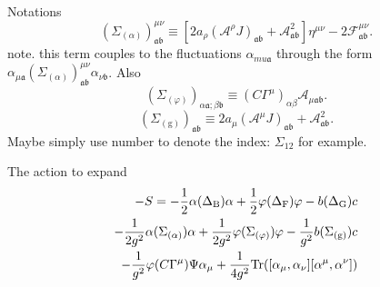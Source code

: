 
Notations
\[
	(\Sigma_{(\alpha)})^{\mu\nu}_{\mathfrak{a}\mathfrak{b}}
	\equiv \left[
	2 a_\rho (\mathcal{A}^\rho J)_{\mathfrak{a}\mathfrak{b}}
	+ \mathcal{A}^2_{\mathfrak{a}\mathfrak{b}}
\right] \eta^{\mu\nu}
- 2 \mathcal{F}^{\mu\nu}_{\mathfrak{a}\mathfrak{b}}
.\] 
note. this term couples to the fluctuations $\alpha_{mu \mathfrak{a}}$
through the form $\alpha_{\mu \mathfrak{a}} 
(\Sigma_{(\alpha)})^{\mu\nu}_{\mathfrak{a}\mathfrak{b}}
\alpha_{\nu \mathfrak{b}}$.
Also
\[
	(\Sigma_{(\varphi)})_{\alpha \mathfrak{a};\beta \mathfrak{b}}
	\equiv (C\Gamma^\mu)_{\alpha\beta}
	\mathcal{A}_{\mu \mathfrak{a}\mathfrak{b}}
.\] 
\[
	(\Sigma_{(\text{g})})_{\mathfrak{a}\mathfrak{b}}
	\equiv 2 a_\mu (\mathcal{A}^\mu J)_{\mathfrak{a}\mathfrak{b}}
	+ \mathcal{A}^2_{\mathfrak{a}\mathfrak{b}}
.\] 
Maybe simply use number to denote the index:
$\Sigma_{12}$ for example.

The action to expand
\begin{align}
	- S = 
	- \frac{1}{2} \alpha (\Delta_{\mathrm{B}}) \alpha
	+ \frac{1}{2} \varphi (\Delta_{\mathrm{F}}) \varphi
	- b ( \Delta_{ \mathrm{G}}) c \notag \\
	- \frac{1}{2g^2} \alpha (\Sigma_{(\alpha)}) \alpha
	+ \frac{1}{2g^2} \varphi (\Sigma_{(\varphi)}) \varphi
	- \frac{1}{g^2} b ( \Sigma_{(\text{g})}) c \notag \\
	- \frac{1}{g^2} \varphi (C\Gamma^\mu) \Psi \alpha_\mu
	+ \frac{1}{4 g^2} \mathrm{Tr}([\alpha_\mu,\alpha_\nu]
	[\alpha^\mu,\alpha^\nu])
\end{align}

